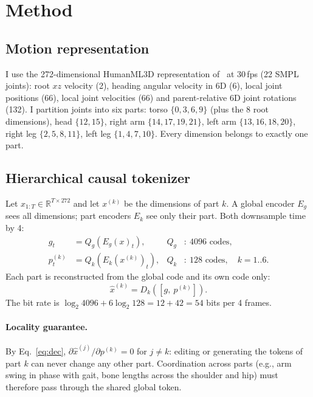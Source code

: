\documentclass[11pt]{article}
\newcommand{\gtok}{g}
\newcommand{\ptok}{p}
\begin{document}
\section{Method}

\subsection{Motion representation}
I use the 272-dimensional HumanML3D representation of~\cite{motionstreamer} at 30\,fps
(22 SMPL joints): root $xz$ velocity (2), heading angular velocity in 6D (6), local joint positions (66),
local joint velocities (66) and parent-relative 6D joint rotations (132).
I partition joints into six parts:
torso $\{0,3,6,9\}$ (plus the 8 root dimensions), head $\{12,15\}$,
right arm $\{14,17,19,21\}$, left arm $\{13,16,18,20\}$,
right leg $\{2,5,8,11\}$, left leg $\{1,4,7,10\}$.
Every dimension belongs to exactly one part.

\subsection{Hierarchical causal tokenizer}
\label{sec:tok}
Let $x_{1:T}\in\mathbb{R}^{T\times 272}$ and let $x^{(k)}$ be the dimensions of part $k$.
A global encoder $E_g$ sees all dimensions; part encoders $E_k$ see only their part.
Both downsample time by 4:
\begin{align}
\gtok_t &= Q_g\!\left(E_g(x)_t\right), & Q_g&:\ 4096 \text{ codes},\\
\ptok^{(k)}_t &= Q_k\!\left(E_k(x^{(k)})_t\right), & Q_k&:\ 128 \text{ codes},\quad k=1..6.
\end{align}
Each part is reconstructed from the global code and its own code only:
\begin{equation}
\hat{x}^{(k)} = D_k\!\left(\left[\gtok,\ \ptok^{(k)}\right]\right).
\label{eq:dec}
\end{equation}
The bit rate is $\log_2 4096 + 6\log_2 128 = 12 + 42 = 54$ bits per 4 frames.

\paragraph{Locality guarantee.}
By Eq.~\eqref{eq:dec}, $\partial \hat{x}^{(j)} / \partial \ptok^{(k)} = 0$ for $j\neq k$:
editing or generating the tokens of part $k$ can never change any other part.
Coordination across parts (e.g., arm swing in phase with gait, bone lengths across the shoulder and hip)
must therefore pass through the shared global token.
\end{document}
